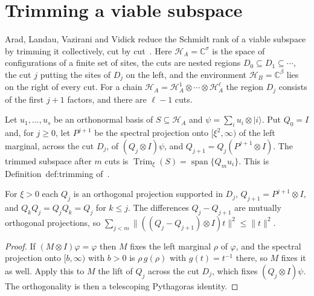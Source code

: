 \section{Trimming a viable subspace}

Arad, Landau, Vazirani and Vidick reduce the Schmidt rank of a viable
subspace by trimming it collectively, cut by cut~\cite[lines
    642--697]{Arad2016RigorousRG}. Here $\mathcal H_A=\mathbb C^\sigma$ is the
space of configurations of a finite set of sites, the cuts are nested regions
$D_0\subseteq D_1\subseteq\cdots$, the cut $j$ putting the sites of $D_j$ on
the left, and the environment $\mathcal H_B=\mathbb C^\beta$ lies on the right
of every cut. For a chain
$\mathcal H_A=\mathcal H_A^1\otimes\cdots\otimes\mathcal H_A^\ell$ the region
$D_j$ consists of the first $j+1$ factors, and there are $\ell-1$ cuts.

\begin{definition}[Trimming]
    \label{def:viable_trimming}
    \leanok
    Let $u_1,\dots,u_s$ be an orthonormal basis of $S\subseteq\mathcal H_A$ and
    $\psi=\sum_iu_i\otimes|i\rangle$. Put $Q_0=I$ and, for $j\ge0$, let
    $P^{j+1}$ be the spectral projection onto $[\xi^2,\infty)$ of the left
    marginal, across the cut $D_j$, of $(Q_j\otimes I)\psi$, and
    $Q_{j+1}=Q_j(P^{j+1}\otimes I)$. The trimmed subspace after $m$ cuts is
    $\operatorname{Trim}_\xi(S)=\operatorname{span}\{Q_mu_i\}$. This is
    Definition~def:trimming of~\cite[lines 642--656]{Arad2016RigorousRG}.
\end{definition}

\begin{theorem}
    \label{thm:viable_trimming_nested}
    \leanok
    For $\xi>0$ each $Q_j$ is an orthogonal projection supported in $D_j$,
    $Q_{j+1}=P^{j+1}\otimes I$, and $Q_kQ_j=Q_jQ_k=Q_j$ for $k\le j$. The
    differences $Q_j-Q_{j+1}$ are mutually orthogonal projections, so
    $\sum_{j<m}\|((Q_j-Q_{j+1})\otimes I)t\|^2\le\|t\|^2$.
\end{theorem}

\begin{proof}
    \leanok
    If $(M\otimes I)\varphi=\varphi$ then $M$ fixes the left marginal $\rho$ of
    $\varphi$, and the spectral projection onto $[b,\infty)$ with $b>0$ is
    $\rho\,g(\rho)$ with $g(t)=t^{-1}$ there, so $M$ fixes it as well. Apply
    this to $M$ the lift of $Q_j$ across the cut $D_j$, which fixes
    $(Q_j\otimes I)\psi$. The orthogonality is then a telescoping Pythagoras
    identity.
\end{proof}

